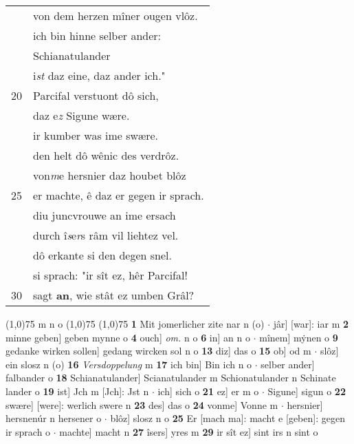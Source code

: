\documentclass[8pt,a4paper,notitlepage]{article}
\begin{document}
\begin{table}[ht]
\begin{minipage}[t]{0.5\linewidth}
\begin{tabular}{rl}
 & von dem herzen mîner ougen vlôz.\\ 
 & ich bin hinne selber ander:\\ 
 & Schianatulander\\ 
 & i\textit{st} daz eine, daz ander ich."\\ 
20 & Parcifal verstuont dô sich,\\ 
 & daz e\textit{z} Sigune wære.\\ 
 & ir kumber was ime swære.\\ 
 & den helt dô wênic des verdrôz.\\ 
 & von\textit{m}e hersnier daz houbet blôz\\ 
25 & er machte, ê daz er gegen ir sprach.\\ 
 & diu juncvrouwe an ime ersach\\ 
 & durch î\textit{s}e\textit{r}s râm vil liehtez vel.\\ 
 & dô erkante si den degen snel.\\ 
 & si sprach: "ir sît ez, hêr Parcifal!\\ 
30 & sagt \textbf{an}, wie stât ez umben Grâl?\\ 
\end{tabular}
\scriptsize
\line(1,0){75} \newline
m n o \newline
\line(1,0){75} \newline
\newline
\line(1,0){75} \newline
\textbf{1} Mit jomerlicher zite nar n (o)  $\cdot$ jâr] [war]: iar m \textbf{2} minne geben] geben mynne o \textbf{4} ouch] \textit{om.} n o \textbf{6} in] an n o  $\cdot$ mînem] mẏnen o \textbf{9} gedanke wirken sollen] gedang wircken sol n o \textbf{13} diz] das o \textbf{15} ob] od m  $\cdot$ slôz] ein slosz n (o) \textbf{16} \textit{Versdoppelung} m  \textbf{17} ich bin] Bin ich n o  $\cdot$ selber ander] falbander o \textbf{18} Schianatulander] Scianatulander m Schionatulander n Schinate lander o \textbf{19} ist] Jch m [Jch]: Jst n  $\cdot$ ich] sich o \textbf{21} ez] er m o  $\cdot$ Sigune] sigun o \textbf{22} swære] [were]: werlich swere n \textbf{23} des] das o \textbf{24} vonme] Vonne m  $\cdot$ hersnier] hersnenúr n hersener o  $\cdot$ blôz] slosz n o \textbf{25} Er [mach ma]: macht e [geben]: gegen ir sprach o  $\cdot$ machte] macht n \textbf{27} îsers] yres m \textbf{29} ir sît ez] sint irs n sint o \newline
\end{minipage}
\end{table}
\end{document}
